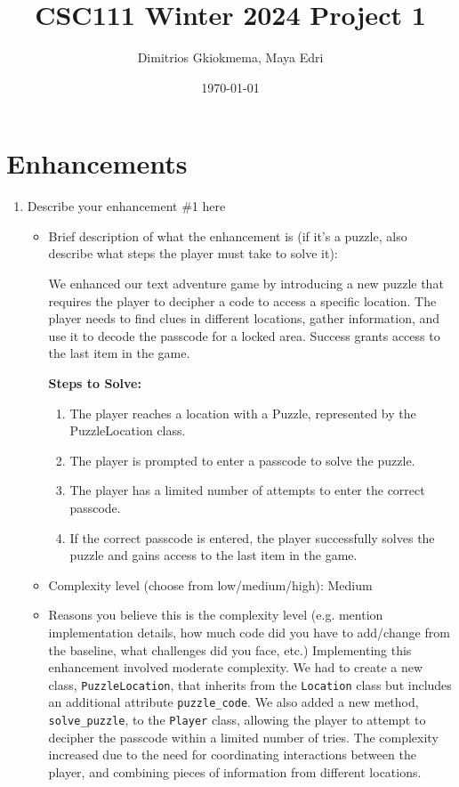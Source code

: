 \documentclass[11pt]{article}
\title{CSC111 Winter 2024 Project 1}
\author{Dimitrios Gkiokmema, Maya Edri}
\date{\today}
\begin{document}
\maketitle

\section*{Enhancements}


\begin{enumerate}

\item Describe your enhancement \#1 here
	\begin{itemize}
	\item Brief description of what the enhancement is (if it's a puzzle, also describe what steps the player must take to solve it): 
 
 We enhanced our text adventure game by introducing a new puzzle that requires the player to decipher a code to access a specific location. The player needs to find clues in different locations, gather information, and use it to decode the passcode for a locked area.  Success grants access to the last item in the game.
 
\textbf{Steps to Solve:}
        \begin{enumerate}
            \item The player reaches a location with a Puzzle, represented by the PuzzleLocation class.
            \item The player is prompted to enter a passcode to solve the puzzle.
            \item The player has a limited number of attempts to enter the correct passcode.
            \item If the correct passcode is entered, the player successfully solves the puzzle and gains access to the last item in the game.
        \end{enumerate}

	\item Complexity level (choose from low/medium/high): Medium
 
	\item Reasons you believe this is the complexity level (e.g. mention implementation details, how much code did you have to add/change from the baseline, what challenges did you face, etc.)
 Implementing this enhancement involved moderate complexity. We had to create a new class, \texttt{PuzzleLocation}, that inherits from the \texttt{Location} class but includes an additional attribute \texttt{puzzle\_code}. We also added a new method, \texttt{solve\_puzzle}, to the \texttt{Player} class, allowing the player to attempt to decipher the passcode within a limited number of tries. The complexity increased due to the need for coordinating interactions between the player, and combining pieces of information from different locations.


\end{itemize}
\end{enumerate}
\end{document}
